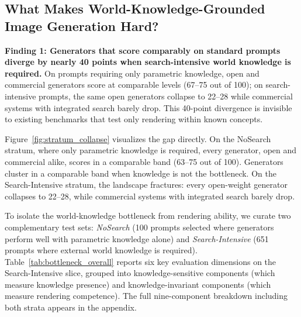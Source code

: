 \documentclass{article}
\begin{document}
\subsection{What Makes World-Knowledge-Grounded Image Generation Hard?} %
\label{sec:bottleneck_finding}



\begin{finding}
\textbf{Finding 1: Generators that score comparably on standard prompts diverge by nearly 40 points when search-intensive world knowledge is required.}
On prompts requiring only parametric knowledge, open and commercial generators score at comparable levels (67--75 out of 100); on search-intensive prompts, the same open generators collapse to 22--28 while commercial systems with integrated search barely drop. This 40-point divergence is invisible to existing benchmarks that test only rendering within known concepts.
\end{finding}

Figure~\ref{fig:stratum_collapse} visualizes the gap directly. On the NoSearch stratum, where only parametric knowledge is required, every generator, open and commercial alike, scores in a comparable band (63--75 out of 100). Generators cluster in a comparable band when knowledge is not the bottleneck. On the Search-Intensive stratum, the landscape fractures: every open-weight generator collapses to 22--28, while commercial systems with integrated search barely drop.


To isolate the world-knowledge bottleneck from rendering ability, we curate two complementary test sets: \emph{NoSearch} (100 prompts selected where generators perform well with parametric knowledge alone) and \emph{Search-Intensive} (651 prompts where external world knowledge is required).
Table~\ref{tab:bottleneck_overall} reports six key evaluation dimensions on the Search-Intensive slice, grouped into knowledge-sensitive components (which measure knowledge presence) and knowledge-invariant components (which measure rendering competence). The full nine-component breakdown including both strata appears in the appendix.
\end{document}
